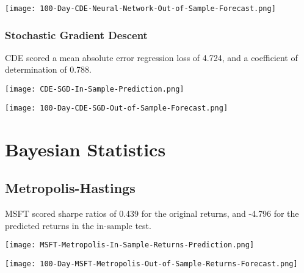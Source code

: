 \begin{center}  
    \texttt{[image: 100-Day-CDE-Neural-Network-Out-of-Sample-Forecast.png]}
    \label{fig:nonfloat}
\end{center}

\subsubsection{Stochastic Gradient Descent}

CDE scored a mean absolute error regression loss of 4.724, and a coefficient of determination of 0.788.

\begin{center}
    \texttt{[image: CDE-SGD-In-Sample-Prediction.png]}
    \label{fig:nonfloat}
\end{center}

\begin{center}  
    \texttt{[image: 100-Day-CDE-SGD-Out-of-Sample-Forecast.png]}
    \label{fig:nonfloat}
\end{center}

\section{Bayesian Statistics}

\subsection{Metropolis-Hastings}
MSFT scored sharpe ratios of 0.439 for the original returns, and -4.796 for the predicted returns in the in-sample test.

\begin{center}
    \texttt{[image: MSFT-Metropolis-In-Sample-Returns-Prediction.png]}
    \label{fig:nonfloat}
\end{center}

\begin{center}  
    \texttt{[image: 100-Day-MSFT-Metropolis-Out-of-Sample-Returns-Forecast.png]}
    \label{fig:nonfloat}
\end{center}

